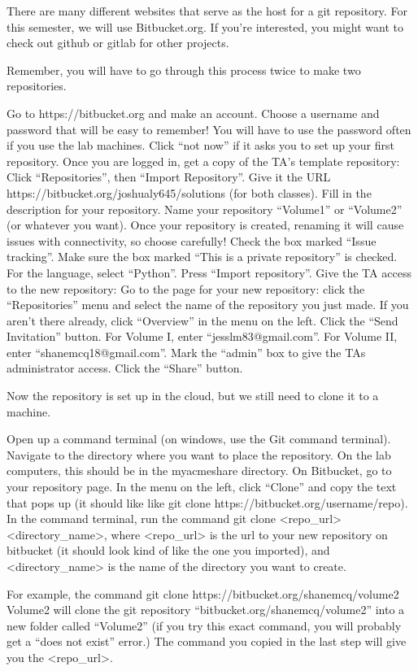 There are many different websites that serve as the host for a git repository. For this semester, we will use Bitbucket.org. If you’re interested, you might want to check out github or gitlab for other projects.

Remember, you will have to go through this process twice to make two repositories.

Go to https://bitbucket.org and make an account. Choose a username and password that will be easy to remember! You will have to use the password often if you use the lab machines.
Click “not now” if it asks you to set up your first repository.
Once you are logged in, get a copy of the TA’s template repository:
Click “Repositories”, then “Import Repository”.
Give it the URL https://bitbucket.org/joshualy645/solutions (for both classes).
Fill in the description for your repository.
Name your repository “Volume1” or “Volume2” (or whatever you want).
Once your repository is created, renaming it will cause issues with connectivity, so choose carefully!
Check the box marked “Issue tracking”.
Make sure the box marked “This is a private repository” is checked.
For the language, select “Python”.
Press “Import repository”.
Give the TA access to the new repository:
Go to the page for your new repository: click the “Repositories” menu and select the name of the repository you just made. If you aren’t there already, click “Overview” in the menu on the left.
Click the “Send Invitation” button. For Volume I, enter “jesslm83@gmail.com”. For Volume II, enter “shanemcq18@gmail.com”.
Mark the “admin” box to give the TAs administrator access.
Click the “Share” button.

Now the repository is set up in the cloud, but we still need to clone it to a machine.

Open up a command terminal (on windows, use the Git command terminal).
Navigate to the directory where you want to place the repository. On the lab computers, this should be in the myacmeshare directory.
On Bitbucket, go to your repository page. In the menu on the left, click “Clone” and copy the text that pops up (it should like like git clone https://bitbucket.org/username/repo).
In the command terminal, run the command git clone <repo\_url> <directory\_name>, where <repo\_url> is the url to your new repository on bitbucket (it should look kind of like the one you imported), and <directory\_name> is the name of the directory you want to create.

For example, the command
  git clone https://bitbucket.org/shanemcq/volume2 Volume2
will clone the git repository “bitbucket.org/shanemcq/volume2” into a new folder called “Volume2” (if you try this exact command, you will probably get a “does not exist” error.) The command you copied in the last step will give you the <repo\_url>.

